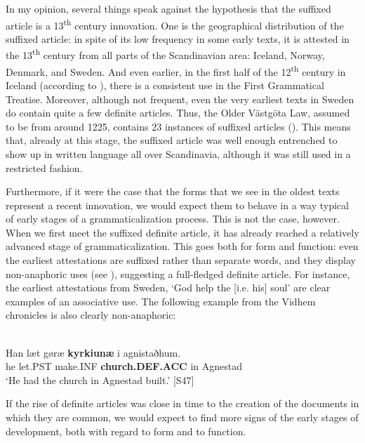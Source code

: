 In my opinion, several things speak against the hypothesis that the suffixed article is a 13\textsuperscript{th} century innovation. One is the geographical distribution of the suffixed article: in spite of its low frequency in some early texts, it is attested in the 13\textsuperscript{th} century from all parts of the Scandinavian area: Iceland, Norway, Denmark, and Sweden.  And even earlier, in the first half of the 12\textsuperscript{th} century in Iceland (according to \citet[§1019]{Perridon2002}), there is a consistent use in the First Grammatical Treatise. Moreover, although not frequent, even the very earliest texts in Sweden do contain quite a few definite articles. Thus, the Older Västgöta Law, assumed to be from around 1225, contains 23 instances of suffixed articles (\citet[24]{Larm1936}). This means that, already at this stage, the suffixed article was well enough entrenched to show up in written language all over Scandinavia, although it was still used in a restricted fashion. 

Furthermore, if it were the case that the forms that we see in the oldest texts represent a recent innovation, we would expect them to behave in a way typical of early stages of a grammaticalization process. This is not the case, however. When we first meet the suffixed definite article, it has already reached a relatively advanced stage of grammaticalization. This goes both for form and function: even the earliest attestations are suffixed rather than separate words, and they display non-anaphoric uses (see ), suggesting a full-fledged definite article. For instance, the earliest attestations from Sweden, ‘God help the [i.e. his] soul’ are clear examples of an associative use. The following example from the Vidhem chronicles is also clearly non-anaphoric:

\ea\label{}
\\
\gll 	Han  læt  gøræ  \textbf{kyrkiunæ} i  agnistaðhum.\\
		he  let.PST  make.INF  \textbf{church.DEF.ACC} in  Agnestad\\
\glt 	‘He had the church in Agnestad built.’ [S47]

\z

If the rise of definite articles was close in time to the creation of the documents in which they are common, we would expect to find more signs of the early stages of development, both with regard to form and to function.

